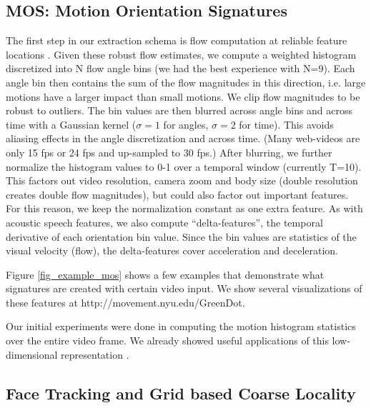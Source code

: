 \documentclass[times, 10pt,twocolumn]{article}
\begin{document}
\subsection{MOS: Motion Orientation Signatures}
\label{sec_MOS}
The first step in our extraction schema is flow computation at reliable feature locations  \cite{ST94,bouget:pil}.  Given these robust flow estimates, we compute a weighted histogram discretized into N flow angle bins (we had the best experience with N=9). Each angle bin then contains the sum of the flow magnitudes in this direction, i.e. large motions have a larger impact than small motions.  We clip flow magnitudes to be robust to outliers.   The bin values are then blurred across angle bins and across time with a Gaussian kernel ($\sigma=1$ for angles,  $\sigma=2$ for time).  This avoids aliasing effects in the angle discretization and across time.  (Many web-videos are only 15 fps or 24 fps and up-sampled to 30 fps.)  After blurring, we further normalize the histogram values to 0-1 over a temporal window (currently T=10).   This factors out video resolution, camera zoom and body size (double resolution creates double flow magnitudes), but could also factor out important features.  For this reason, we keep the normalization constant as one extra feature. 
As with acoustic speech features, we also compute ``delta-features'', the temporal derivative of each orientation bin value.    Since the bin values are statistics of the visual velocity (flow), the delta-features cover acceleration and deceleration.  


Figure \ref{fig_example_mos} shows a few examples that demonstrate what signatures are created with certain video input.  We show several visualizations of these features at http://movement.nyu.edu/GreenDot.

Our initial experiments were done in computing the motion histogram statistics over the entire video frame.  We already showed useful applications of this low-dimensional representation  \cite{breglerICASSP09}. 

\subsection{Face Tracking and Grid based Coarse Locality}
\end{document}
